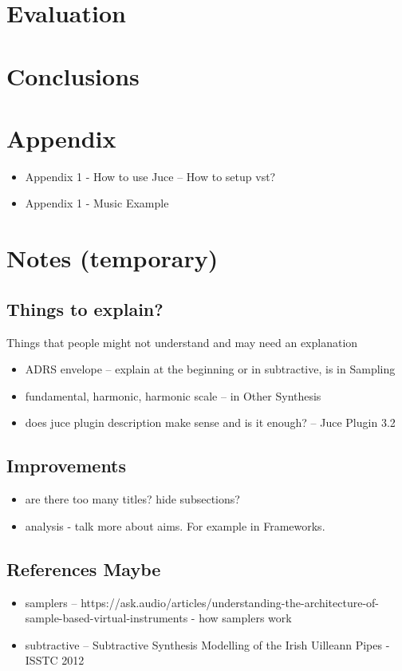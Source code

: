\documentclass[12pt]{article}
\begin{document}
	
	

	
\section{Evaluation}
	
\section{Conclusions}
	
\section{Appendix}
	\begin{itemize}
		\item Appendix 1 - How to use Juce -- How to setup vst?
		\item Appendix 1 - Music Example
	\end{itemize}


\section{Notes (temporary)}
	\subsection{Things to explain? }
	Things that people might not understand and may need an explanation
	\begin{itemize}
		\item ADRS envelope -- explain at the beginning or in subtractive, is in Sampling
		\item fundamental, harmonic, harmonic scale -- in Other Synthesis
		\item does juce plugin description make sense and is it enough? -- Juce Plugin 3.2
	\end{itemize}

	\subsection{Improvements}
	\begin{itemize}
		\item are there too many titles? hide subsections?
		\item analysis - talk more about aims. For example in Frameworks.
	\end{itemize}

	\subsection{References Maybe}
	\begin{itemize}
		\item samplers -- https://ask.audio/articles/understanding-the-architecture-of-sample-based-virtual-instruments - how samplers work
		\item subtractive -- Subtractive Synthesis Modelling of the Irish Uilleann Pipes - ISSTC 2012
	\end{itemize}
	



	
\end{document}
